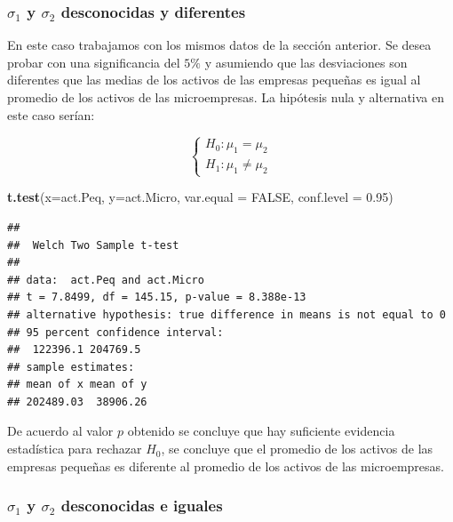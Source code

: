 \documentclass[
]{krantz}
\makeatletter
\newenvironment{Shaded}{\begin{snugshade}}{\end{snugshade}}
\newcommand{\DataTypeTok}[1]{\textcolor[rgb]{0.27,0.27,0.27}{#1}}
\newcommand{\FloatTok}[1]{\textcolor[rgb]{0.06,0.06,0.06}{#1}}
\newcommand{\KeywordTok}[1]{\textcolor[rgb]{0.27,0.27,0.27}{\textbf{#1}}}
\newcommand{\NormalTok}[1]{#1}
\newcommand{\OtherTok}[1]{\textcolor[rgb]{0.37,0.37,0.37}{#1}}
\newenvironment{kframe}{%
\medskip{}
\setlength{\fboxsep}{.8em}
 \def\at@end@of@kframe{}%
 \ifinner\ifhmode%
  \def\at@end@of@kframe{\end{minipage}}%
  \begin{minipage}{\columnwidth}%
 \fi\fi%
 \def\FrameCommand##1{\hskip\@totalleftmargin \hskip-\fboxsep
 \colorbox{shadecolor}{##1}\hskip-\fboxsep
     \hskip-\linewidth \hskip-\@totalleftmargin \hskip\columnwidth}%
 \MakeFramed {\advance\hsize-\width
   \@totalleftmargin\z@ \linewidth\hsize
   \@setminipage}}%
 {\par\unskip\endMakeFramed%
 \at@end@of@kframe}
\renewenvironment{Shaded}{\begin{kframe}}{\end{kframe}}
\makeatother
\begin{document}
\hypertarget{sigma_1-y-sigma_2-desconocidas-y-diferentes}{%
\subsubsection{\texorpdfstring{\(\sigma_1\) y \(\sigma_2\) desconocidas y diferentes}{\textbackslash{}sigma\_1 y \textbackslash{}sigma\_2 desconocidas y diferentes}}\label{sigma_1-y-sigma_2-desconocidas-y-diferentes}}

En este caso trabajamos con los mismos datos de la sección anterior. Se desea probar con una significancia del \(5\%\) y asumiendo que las desviaciones son diferentes que las medias de los activos de las empresas pequeñas es igual al promedio de los activos de las microempresas. La hipótesis nula y alternativa en este caso serían:

\begin{equation} 
\begin{cases} 
H_0: \mu_1 = \mu_2 \\ 
H_1: \mu_1 \neq \mu_2
\end{cases} 
\end{equation}

\begin{Shaded}
\begin{Highlighting}[]
\KeywordTok{t.test}\NormalTok{(}\DataTypeTok{x=}\NormalTok{act.Peq, }\DataTypeTok{y=}\NormalTok{act.Micro, }\DataTypeTok{var.equal =} \OtherTok{FALSE}\NormalTok{,}
       \DataTypeTok{conf.level =} \FloatTok{0.95}\NormalTok{)}
\end{Highlighting}
\end{Shaded}

\begin{verbatim}
## 
##  Welch Two Sample t-test
## 
## data:  act.Peq and act.Micro
## t = 7.8499, df = 145.15, p-value = 8.388e-13
## alternative hypothesis: true difference in means is not equal to 0
## 95 percent confidence interval:
##  122396.1 204769.5
## sample estimates:
## mean of x mean of y 
## 202489.03  38906.26
\end{verbatim}

De acuerdo al valor \(p\) obtenido se concluye que hay suficiente evidencia estadística para rechazar \(H_0\), se concluye que el promedio de los activos de las empresas pequeñas es diferente al promedio de los activos de las microempresas.

\hypertarget{sigma_1-y-sigma_2-desconocidas-e-iguales}{%
\subsubsection{\texorpdfstring{\(\sigma_1\) y \(\sigma_2\) desconocidas e iguales}{\textbackslash{}sigma\_1 y \textbackslash{}sigma\_2 desconocidas e iguales}}\label{sigma_1-y-sigma_2-desconocidas-e-iguales}}
\end{document}
